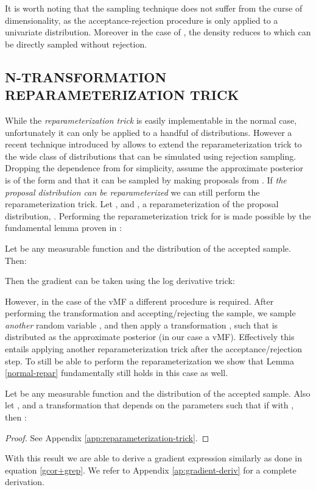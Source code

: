 \documentclass[letterpaper]{article}
\begin{document}
It is worth noting that the sampling technique does not suffer from the curse of dimensionality, as the acceptance-rejection procedure is only applied to a univariate distribution. Moreover in the case of , the density  reduces to  which can be directly sampled without rejection.

\subsection{N-TRANSFORMATION REPARAMETERIZATION TRICK}\label{sec:reparameterization}

While the \textit{reparameterization trick} is easily implementable in the normal case, unfortunately it can only be applied to a handful of distributions. However a recent technique introduced by \cite{rejection-repar} allows to extend the reparameterization trick to the wide class of distributions that can be simulated using rejection sampling. Dropping the dependence from  for simplicity, assume the approximate posterior is of the form  and that it can be sampled by making proposals from . If {\it the proposal distribution can be reparameterized} we can still perform the reparameterization trick. Let , and , a reparameterization of the proposal distribution, . Performing the reparameterization trick for  is made possible by the fundamental lemma proven in \citep{rejection-repar}:
\begin{lem}\label{normal-repar}
Let  be any measurable function and  the distribution of the accepted sample.  Then:

\end{lem}
Then the gradient can be taken using the log derivative trick:


However, in the case of the vMF a different procedure is required. After performing the transformation  and accepting/rejecting the sample, we sample \textit{another} random variable , and then apply a transformation , such that  is distributed as the approximate posterior (in our case a vMF). Effectively this entails applying another reparameterization trick after the acceptance/rejection step. To still be able to perform the reparameterization we show that Lemma \ref{normal-repar} fundamentally still holds in this case as well.
\begin{lem}\label{our-repar}
Let  be any measurable function and  the distribution of the accepted sample. 
Also let , and  a transformation that depends on the parameters such that if  with , then :

\begin{proof}
    See Appendix \ref{app:reparameterization-trick}.
\end{proof}
\end{lem}
With this result we are able to derive a gradient expression similarly as done in equation \ref{gcor+grep}. We refer to Appendix \ref{ap:gradient-deriv} for a complete derivation. 
\end{document}
